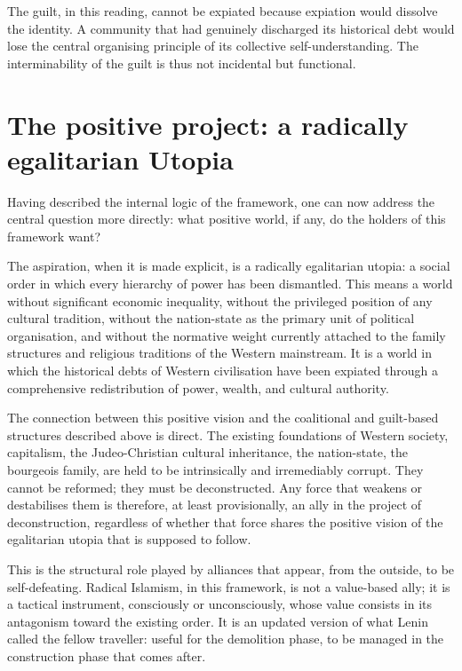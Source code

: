 	The guilt, in this reading, cannot be expiated because expiation would dissolve the
	identity. A community that had genuinely discharged its historical debt would lose
	the central organising principle of its collective self-understanding. The
	interminability of the guilt is thus not incidental but functional.
	
	\section{The positive project: a radically egalitarian Utopia}
	
	Having described the internal logic of the framework, one can now address the
	central question more directly: what positive world, if any, do the holders of this
	framework want?
	
	The aspiration, when it is made explicit, is a radically egalitarian utopia: a
	social order in which every hierarchy of power has been dismantled. This means a
	world without significant economic inequality, without the privileged position of
	any cultural tradition, without the nation-state as the primary unit of political
	organisation, and without the normative weight currently attached to the family
	structures and religious traditions of the Western mainstream. It is a world in
	which the historical debts of Western civilisation have been expiated through a
	comprehensive redistribution of power, wealth, and cultural authority.
	
	The connection between this positive vision and the coalitional and guilt-based
	structures described above is direct. The existing foundations of Western
	society, capitalism, the Judeo-Christian cultural inheritance, the nation-state,
	the bourgeois family, are held to be intrinsically and irremediably corrupt. They
	cannot be reformed; they must be deconstructed. Any force that weakens or
	destabilises them is therefore, at least provisionally, an ally in the project of
	deconstruction, regardless of whether that force shares the positive vision of the
	egalitarian utopia that is supposed to follow.
	
	This is the structural role played by alliances that appear, from the outside, to be
	self-defeating. Radical Islamism, in this framework, is not a value-based ally; it
	is a tactical instrument, consciously or unconsciously, whose value consists in
	its antagonism toward the existing order. It is an updated version of what Lenin
	called the fellow traveller: useful for the demolition phase, to be managed in the
	construction phase that comes after.
	
